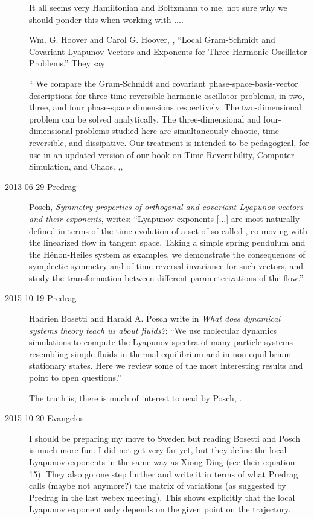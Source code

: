 \begin{description}
It all seems very Hamiltonian and Boltzmann to me, not sure why we
should ponder this when working with \KS....

Wm. G. Hoover and Carol G. Hoover, ,
``Local Gram-Schmidt and Covariant Lyapunov Vectors and Exponents for
 Three Harmonic Oscillator Problems.'' They say

``
We compare the Gram-Schmidt and covariant phase-space-basis-vector
descriptions for three time-reversible harmonic oscillator problems, in two,
three, and four phase-space dimensions respectively. The two-dimensional
problem can be solved analytically. The three-dimensional and four-dimensional
problems studied here are simultaneously chaotic, time-reversible, and
dissipative. Our treatment is intended to be pedagogical, for use in an updated
version of our book on Time Reversibility, Computer Simulation, and Chaos.
,,

\item[2013-06-29 Predrag]
Posch,
{\em Symmetry properties of orthogonal and
   covariant {Lyapunov} vectors and their exponents}, writes:
   ``Lyapunov exponents [...] are most naturally defined in terms of
the time evolution of a set of so-called {\cLvs}, co-moving
with the linearized flow in tangent space. Taking a simple spring
pendulum and the H\'enon-Heiles system as examples, we demonstrate the
consequences of symplectic symmetry and of time-reversal invariance for
such vectors, and study the transformation between different
parameterizations of the flow.''

\item[2015-10-19 Predrag]
Hadrien Bosetti and Harald A. Posch write in
{\em What does dynamical systems theory teach us about fluids?}:
``We use molecular dynamics simulations to compute the Lyapunov spectra
of many-particle systems resembling simple fluids in thermal equilibrium
and in non-equilibrium stationary states. Here we review some of the most
interesting results and point to open questions.''

The truth is, there is much of interest to read by Posch,
.

\item[2015-10-20 Evangelos] I should be preparing my move to Sweden but
reading Bosetti and Posch~\cite{BosPos14} is much more fun. I did not get
very far yet, but they define the local Lyapunov exponents in the same
way as Xiong Ding (see their equation 15). They also go one step further
and write it in terms of what Predrag calls (maybe not anymore?) the
matrix of variations (as suggested by Predrag in the last webex meeting).
This shows explicitly that the local Lyapunov exponent only depends on
the given point on the trajectory.


\end{description}
